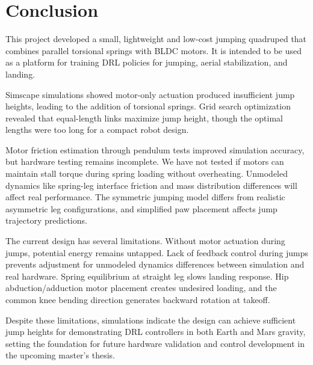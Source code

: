 \section{Conclusion}
\label{sec:conclusion}

This project developed a small, lightweight and low-cost jumping quadruped that combines parallel torsional springs with BLDC motors. It is intended to be used as a platform for training DRL policies for jumping, aerial stabilization, and landing.

Simscape simulations showed motor-only actuation produced insufficient jump heights, leading to the addition of torsional springs. Grid search optimization revealed that equal-length links maximize jump height, though the optimal lengths were too long for a compact robot design.

Motor friction estimation through pendulum tests improved simulation accuracy, but hardware testing remains incomplete. We have not tested if motors can maintain stall torque during spring loading without overheating. Unmodeled dynamics like spring-leg interface friction and mass distribution differences will affect real performance. The symmetric jumping model differs from realistic asymmetric leg configurations, and simplified paw placement affects jump trajectory predictions.

The current design has several limitations. Without motor actuation during jumps, potential energy remains untapped. Lack of feedback control during jumps prevents adjustment for unmodeled dynamics differences between simulation and real hardware. Spring equilibrium at straight leg slows landing response. Hip abduction/adduction motor placement creates undesired loading, and the common knee bending direction generates backward rotation at takeoff.

Despite these limitations, simulations indicate the design can achieve sufficient jump heights for demonstrating DRL controllers in both Earth and Mars gravity, setting the foundation for future hardware validation and control development in the upcoming master's thesis.
